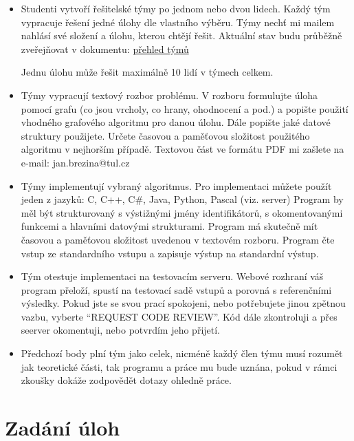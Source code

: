 \documentclass[a4paper,10pt]{article}
\begin{document}
  \begin{itemize}
  \item   Studenti vytvoří řešitelské týmy po jednom nebo dvou lidech. Každý tým vypracuje řešení jedné úlohy dle vlastního výběru. Týmy nechť mi mailem nahlásí své složení a úlohu, kterou chtějí řešit.  Aktuální stav budu průběžně zveřejňovat v dokumentu:
 \href{https://drive.google.com/open?id=1eNz0321roZ7HAvuPMlfl2GOdHFszRVIkuvPEqD36uX0}{přehled týmů}
 
 Jednu úlohu může řešit maximálně 10 lidí v týmech celkem.

  \item Týmy vypracují textový rozbor problému. V rozboru formulujte úloha  pomocí grafu (co jsou vrcholy, co hrany, ohodnocení a pod.)
  a popište použití vhodného grafového algoritmu pro danou úlohu. Dále popište jaké datové struktury použijete. 
  Určete časovou a paměťovou složitost použitého algoritmu v nejhorším případě. 
  Textovou část ve formátu PDF mi zašlete na e-mail: jan.brezina@tul.cz 
         

  \item  Týmy implementují vybraný algoritmus. Pro implementaci můžete použít jeden z jazyků: C, C++, C\#, Java, Python, Pascal (viz. server)
   Program by měl být strukturovaný s výstižnými jmény identifikátorů, s okomentovanými funkcemi a hlavními datovými strukturami. 
   Program má skutečně mít časovou a paměťovou složitost uvedenou v textovém rozboru. Program čte vstup ze standardního vstupu a zapisuje výstup na standardní výstup.
  
  \item  Tým otestuje implementaci na testovacím serveru. Webové rozhraní váš program přeloží, 
        spustí na testovací sadě vstupů a porovná s referenčními výsledky. Pokud jste se svou prací spokojeni, nebo potřebujete jinou zpětnou vazbu, vyberte ``REQUEST CODE REVIEW''. Kód dále zkontroluji a přes seerver okomentuji, nebo potvrdím jeho přijetí.

  \item  Předchozí body plní tým jako celek, nicméně každý člen týmu musí rozumět jak teoretické části, tak programu a práce mu bude uznána, pokud v rámci zkoušky dokáže zodpovědět dotazy ohledně práce.
 \end{itemize}

\section{Zadání úloh}
\end{document}
